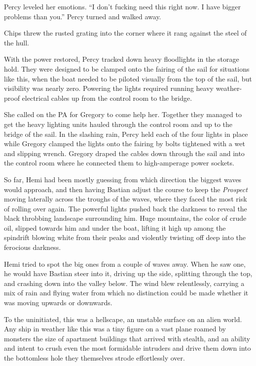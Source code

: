\documentclass[
]{scrbook}
\begin{document}
Percy leveled her emotions. ``I don't fucking need this right now. I
have bigger problems than you.'' Percy turned and walked away.

Chips threw the rusted grating into the corner where it rang against the
steel of the hull.

\bigskip

With the power restored, Percy tracked down heavy floodlights in the
storage hold. They were designed to be clamped onto the fairing of the
sail for situations like this, when the boat needed to be piloted
visually from the top of the sail, but visibility was nearly zero.
Powering the lights required running heavy weather-proof electrical
cables up from the control room to the bridge.

She called on the PA for Gregory to come help her. Together they managed
to get the heavy lighting units hauled through the control room and up
to the bridge of the sail. In the slashing rain, Percy held each of the
four lights in place while Gregory clamped the lights onto the fairing
by bolts tightened with a wet and slipping wrench. Gregory draped the
cables down through the sail and into the control room where he
connected them to high-amperage power sockets.

So far, Hemi had been mostly guessing from which direction the biggest
waves would approach, and then having Bastian adjust the course to keep
the \emph{Prospect} moving laterally across the troughs of the waves,
where they faced the most risk of rolling over again. The powerful
lights pushed back the darkness to reveal the black throbbing landscape
surrounding him. Huge mountains, the color of crude oil, slipped towards
him and under the boat, lifting it high up among the spindrift blowing
white from their peaks and violently twisting off deep into the
ferocious darkness.

Hemi tried to spot the big ones from a couple of waves away. When he saw
one, he would have Bastian steer into it, driving up the side, splitting
through the top, and crashing down into the valley below. The wind blew
relentlessly, carrying a mix of rain and flying water from which no
distinction could be made whether it was moving upwards or downwards.

To the uninitiated, this was a hellscape, an unstable surface on an
alien world. Any ship in weather like this was a tiny figure on a vast
plane roamed by monsters the size of apartment buildings that arrived
with stealth, and an ability and intent to crush even the most
formidable intruders and drive them down into the bottomless hole they
themselves strode effortlessly over.
\end{document}
